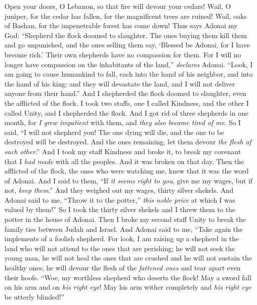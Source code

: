 \begin{biblechapter} %
\verse Open your doors, O Lebanon,
\verse so that fire will devour your cedars!
\verse Wail, O juniper, for the cedar has fallen, 
for the magnificent trees are ruined! 
Wail, oaks of Bashan, 
for the impenetrable forest has come down!
 Thus says Adonai my God: “Shepherd the flock doomed to slaughter.
\verse The ones buying them kill them and go unpunished, and the ones selling them say, ‘Blessed be Adonai, for I have become rich.’ Their own shepherds have no compassion for them.
\verse For I will no longer have compassion on the inhabitants of the land,” \textit{declares} Adonai. “Look, I am going to cause humankind to fall, each into the hand of his neighbor, and into the hand of his king; and they will devastate the land, and I will not deliver anyone from their hand.”
\verse And I shepherded the flock doomed to slaughter, even the afflicted of the flock. I took two staffs, one I called Kindness, and the other I called Unity, and I shepherded the flock.
\verse And I got rid of three shepherds in one month, for \textit{I grew impatient} with them, and \textit{they also became tired of me}.
\verse So I said, “I will not shepherd you! The one dying will die, and the one to be destroyed will be destroyed. And the ones remaining, let them devour \textit{the flesh of each other}.”
\verse And I took my staff Kindness and broke it, to break my covenant that I \textit{had made} with all the peoples.
\verse And it was broken on that day. Then the afflicted of the flock, the ones who were watching me, knew that it was the word of Adonai.
\verse And I said to them, “If \textit{it seems right to you}, give me my wages, but if not, \textit{keep them}.” And they weighed out my wages, thirty silver shekels.
\verse And Adonai said to me, “Throw it to the potter,” \textit{this noble price} at which I was valued by them!” So I took the thirty silver shekels and I threw them to the potter in the house of Adonai.
\verse Then I broke my second staff Unity to break the family ties between Judah and Israel.
\verse And Adonai said to me, “Take again the implements of a foolish shepherd.
\verse For look, I am raising up a shepherd in the land who will not attend to the ones that are perishing; he will not seek the young man, he will not heal the ones that are crushed and he will not sustain the healthy ones; he will devour the flesh of the \textit{fattened ones} and tear apart even their hoofs.
\verse “Woe, my worthless shepherd 
who deserts the flock! 
May a sword fall on his arm 
and on \textit{his right eye}! 
May his arm wither completely 
and \textit{his right eye} be utterly blinded!”
\end{biblechapter}

